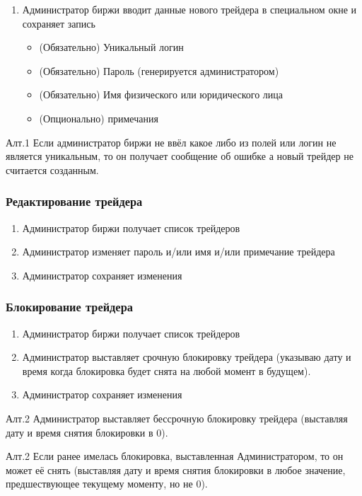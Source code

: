 \documentclass[a4paper, 12pt]{article}        %
\begin{document}
\begin{enumerate}
\item Администратор биржи вводит данные нового трейдера в специальном окне и сохраняет запись
\begin{itemize}
\item (Обязательно) Уникальный логин
\item (Обязательно) Пароль (генерируется администратором)
\item (Обязательно) Имя физического или юридического лица
\item (Опционально) примечания
\end{itemize}
\end{enumerate}

Алт.1 Если администратор биржи не ввёл какое либо из полей или логин не является уникальным, то он получает сообщение об ошибке а новый трейдер не считается созданным.

\subsubsection{Редактирование трейдера}

\begin{enumerate}
\item Администратор биржи получает список трейдеров
\item Администратор изменяет пароль и/или имя и/или примечание трейдера
\item Администратор сохраняет изменения
\end{enumerate}

\subsubsection{Блокирование трейдера}

\begin{enumerate}
\item Администратор биржи получает список трейдеров
\item Администратор выставляет срочную блокировку трейдера (указываю дату и время когда блокировка будет  снята на любой момент в будущем).
\item Администратор сохраняет изменения
\end{enumerate}

Алт.2 Администратор выставляет бессрочную блокировку трейдера (выставляя дату и время снятия блокировки в 0).

Алт.2 Если ранее имелась блокировка, выставленная Администратором, то он может её снять (выставляя дату и время снятия блокировки в любое значение, предшествующее текущему моменту, но не 0).
\end{document}
